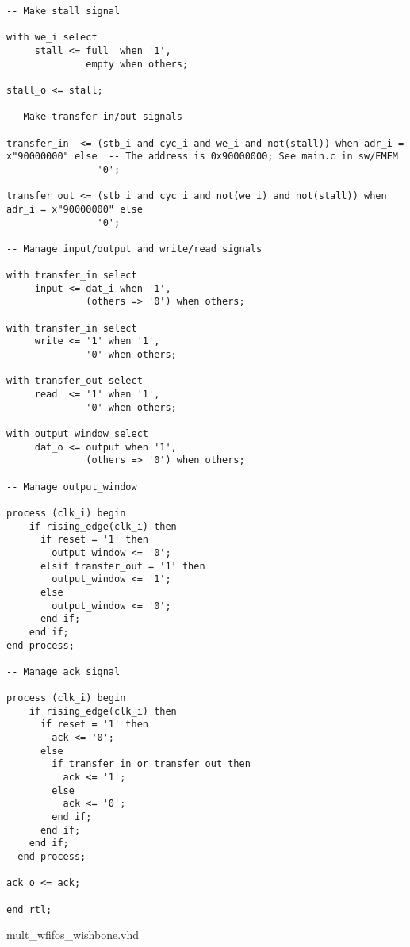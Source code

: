 \begin{code}
\begin{verbatim}
-- Make stall signal

with we_i select 
     stall <= full  when '1',
              empty when others;

stall_o <= stall;

-- Make transfer in/out signals

transfer_in  <= (stb_i and cyc_i and we_i and not(stall)) when adr_i = x"90000000" else  -- The address is 0x90000000; See main.c in sw/EMEM
                '0';

transfer_out <= (stb_i and cyc_i and not(we_i) and not(stall)) when adr_i = x"90000000" else
                '0';

-- Manage input/output and write/read signals

with transfer_in select
     input <= dat_i when '1',
              (others => '0') when others;

with transfer_in select
     write <= '1' when '1',
              '0' when others;

with transfer_out select
     read  <= '1' when '1',
              '0' when others;

with output_window select
     dat_o <= output when '1',
              (others => '0') when others;

-- Manage output_window

process (clk_i) begin
    if rising_edge(clk_i) then
      if reset = '1' then
        output_window <= '0';
      elsif transfer_out = '1' then
        output_window <= '1';
      else
        output_window <= '0';
      end if;
    end if;
end process;

-- Manage ack signal

process (clk_i) begin
    if rising_edge(clk_i) then
      if reset = '1' then
        ack <= '0';
      else
        if transfer_in or transfer_out then
          ack <= '1';
        else
          ack <= '0';
        end if;
      end if;
    end if;
  end process;
                
ack_o <= ack;

end rtl;
\end{verbatim}
\caption{mult\_wfifos\_wishbone.vhd}
\label{ap-cod:5}
\end{code}

